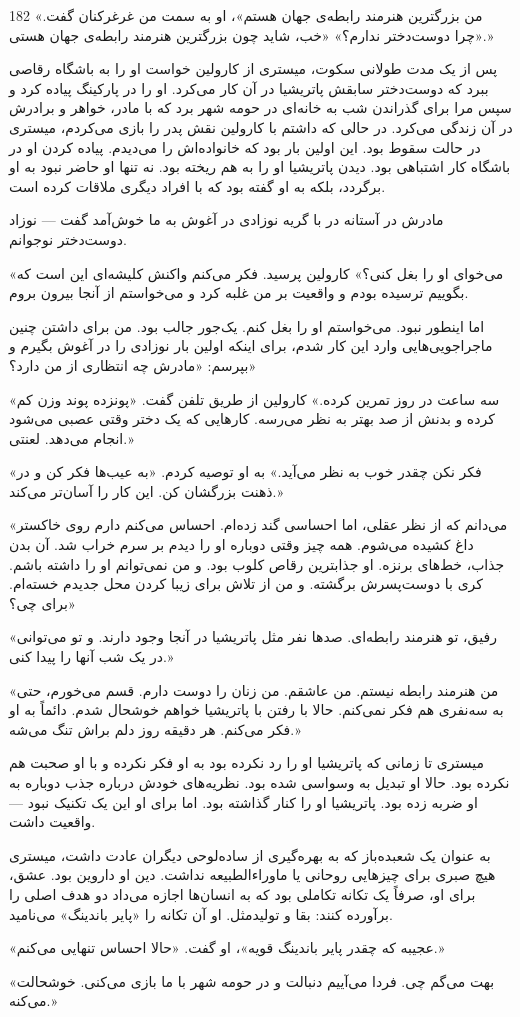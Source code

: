 182
«من بزرگترین هنرمند رابطه‌ی جهان هستم»، او به سمت من غرغرکنان گفت.
«چرا دوست‌دختر ندارم؟»
«خب، شاید چون بزرگترین هنرمند رابطه‌ی جهان هستی.»

پس از یک مدت طولانی سکوت، میستری از کارولین خواست او را به باشگاه رقاصی ببرد که دوست‌دختر سابقش پاتریشیا در آن کار می‌کرد. او را در پارکینگ پیاده کرد و سپس مرا برای گذراندن شب به خانه‌ای در حومه شهر برد که با مادر، خواهر و برادرش در آن زندگی می‌کرد. در حالی که داشتم با کارولین نقش پدر را بازی می‌کردم، میستری در حالت سقوط بود. این اولین بار بود که خانواده‌اش را می‌دیدم. پیاده کردن او در باشگاه کار اشتباهی بود. دیدن پاتریشیا او را به هم ریخته بود. نه تنها او حاضر نبود به او برگردد، بلکه به او گفته بود که با افراد دیگری ملاقات کرده است.

مادرش در آستانه در با گریه نوزادی در آغوش به ما خوش‌آمد گفت — نوزاد دوست‌دختر نوجوانم.

«می‌خوای او را بغل کنی؟» کارولین پرسید. فکر می‌کنم واکنش کلیشه‌ای این است که بگوییم ترسیده بودم و واقعیت بر من غلبه کرد و می‌خواستم از آنجا بیرون بروم.

اما اینطور نبود. می‌خواستم او را بغل کنم. یک‌جور جالب بود. من برای داشتن چنین ماجراجویی‌هایی وارد این کار شدم، برای اینکه اولین بار نوزادی را در آغوش بگیرم و بپرسم: «مادرش چه انتظاری از من دارد؟»

«سه ساعت در روز تمرین کرده.» کارولین از طریق تلفن گفت. «پونزده پوند وزن کم کرده و بدنش از صد بهتر به نظر می‌رسه. کارهایی که یک دختر وقتی عصبی می‌شود انجام می‌دهد. لعنتی.»

«فکر نکن چقدر خوب به نظر می‌آید.» به او توصیه کردم. «به عیب‌ها فکر کن و در ذهنت بزرگشان کن. این کار را آسان‌تر می‌کند.»

«می‌دانم که از نظر عقلی، اما احساسی گند زده‌ام. احساس می‌کنم دارم روی خاکستر داغ کشیده می‌شوم. همه چیز وقتی دوباره او را دیدم بر سرم خراب شد. آن بدن جذاب، خط‌های برنزه. او جذابترین رقاص کلوب بود. و من نمی‌توانم او را داشته باشم. کری با دوست‌پسرش برگشته. و من از تلاش برای زیبا کردن محل جدیدم خسته‌ام. برای چی؟»

«رفیق، تو هنرمند رابطه‌ای. صدها نفر مثل پاتریشیا در آنجا وجود دارند. و تو می‌توانی در یک شب آنها را پیدا کنی.»

«من هنرمند رابطه نیستم. من عاشقم. من زنان را دوست دارم. قسم می‌خورم، حتی به سه‌نفری هم فکر نمی‌کنم. حالا با رفتن با پاتریشیا خواهم خوشحال شدم. دائماً به او فکر می‌کنم. هر دقیقه روز دلم براش تنگ می‌شه.»

میستری تا زمانی که پاتریشیا او را رد نکرده بود به او فکر نکرده و با او صحبت هم نکرده بود. حالا او تبدیل به وسواسی شده بود. نظریه‌های خودش درباره جذب دوباره به او ضربه زده بود. پاتریشیا او را کنار گذاشته بود. اما برای او این یک تکنیک نبود — واقعیت داشت.

به عنوان یک شعبده‌باز که به بهره‌گیری از ساده‌لوحی دیگران عادت داشت، میستری هیچ صبری برای چیزهایی روحانی یا ماوراءالطبیعه نداشت. دین او داروین بود. عشق، برای او، صرفاً یک تکانه تکاملی بود که به انسان‌ها اجازه می‌داد دو هدف اصلی را برآورده کنند: بقا و تولیدمثل. او آن تکانه را «پایر باندینگ» می‌نامید.

«عجیبه که چقدر پایر باندینگ قویه»، او گفت. «حالا احساس تنهایی می‌کنم.»

«بهت می‌گم چی. فردا می‌آییم دنبالت و در حومه شهر با ما بازی می‌کنی. خوشحالت می‌کنه.»